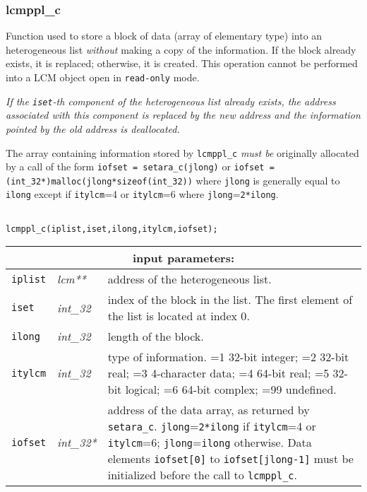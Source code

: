 \subsubsection{lcmppl\_c}

Function used to store a block of data (array of elementary type) into an heterogeneous list
{\sl without} making a copy of the information. If the block already exists, it is replaced;
otherwise, it is created. This operation cannot be performed into a LCM object open in {\tt read-only} mode.

\vskip 0.2cm

{\sl If the {\tt iset}-th component of the heterogeneous list already exists, the address associated
with this component  is replaced by the new address and the information pointed by the old address
is deallocated.}

\vskip 0.2cm

The array containing information stored by {\tt lcmppl\_c} {\sl must be} originally
allocated by a call of the form 
{\tt iofset = setara\_c(jlong)} or {\tt iofset = (int\_32*)malloc(jlong*sizeof(int\_32))}
where {\tt jlong} is generally equal to {\tt ilong} except if
{\tt itylcm}=4 or {\tt itylcm}=6 where {\tt jlong}={\tt 2*ilong}.
 
\begin{verbatim}

lcmppl_c(iplist,iset,ilong,itylcm,iofset);
\end{verbatim}

\noindent
\begin{tabular}{|p{1.5cm}|p{2cm}|p{11cm}|}
\hline
\multicolumn{3}{|c|}{\bf input parameters:} \\
\hline
{\tt iplist} & {\it lcm**} & address of the heterogeneous list. \\
\hline
{\tt iset} & {\it int\_32} & index of the block in the list.
The first element of the list is located at index $0$. \\
\hline
{\tt ilong} & {\it int\_32} & length of the block. \\
\hline
{\tt itylcm} & {\it int\_32} & type of information. =1 32-bit integer; 
                                    =2 32-bit real; =3 4-character data; 
				    =4 64-bit real; =5 32-bit logical; =6 64-bit complex;
				    =99 undefined. \\
\hline
{\tt iofset} & {\it int\_32*} & address of the data array, as returned by {\tt setara\_c}. {\tt jlong}={\tt 2*ilong}
                                   if {\tt itylcm}=4 or {\tt itylcm}=6; {\tt jlong}={\tt ilong} otherwise.
                                   Data elements {\tt iofset[0]} to {\tt iofset[jlong-1]} 
				   must be initialized before the call to {\tt lcmppl\_c}. \\
\hline
\end{tabular}

